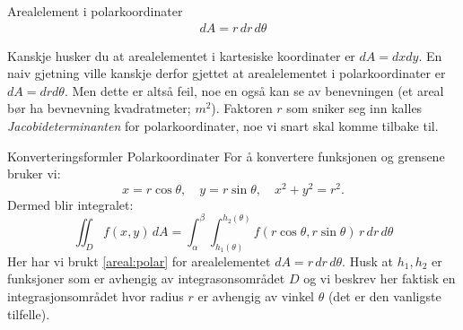 \begin{defn}{Arealelement i polarkoordinater}\label{areal_i_polar}
\begin{align}\label{areal:polar}
dA = r\, dr\, d\theta
\end{align}
\end{defn}
Kanskje husker du at arealelementet i kartesiske koordinater er $dA=dxdy$. En naiv gjetning ville kanskje derfor gjettet at arealelementet i polarkoordinater er $dA=drd\theta$. Men dette er altså feil, noe en også kan se av benevningen (et areal bør ha bevnevning kvadratmeter; $m^2$). Faktoren $r$ som sniker seg inn kalles \textit{Jacobideterminanten} for polarkoordinater, noe vi snart skal komme tilbake til.

\begin{oppsum}{Konverteringsformler Polarkoordinater}
For å konvertere funksjonen og grensene bruker vi:
\[
x = r \cos \theta,\quad y = r \sin \theta,\quad x^2 + y^2 = r^2.
\]
Dermed blir integralet:
\[
\iint_D f(x, y)\, dA = \int_\alpha^\beta \int_{h_1(\theta)}^{h_2(\theta)} f(r \cos \theta, r \sin \theta) \, r\, dr\, d\theta
\]
Her har vi brukt \eqref{areal:polar} for arealelementet $dA =r\, dr\, d\theta$. Husk at $h_1,h_2$ er funksjoner som er avhengig av integrasonsområdet $D$ og vi beskrev her faktisk en integrasjonsområdet hvor radius $r$ er avhengig av vinkel $\theta$ (det er den vanligste tilfelle).
\end{oppsum}

